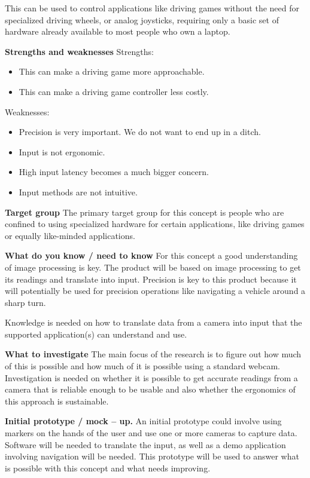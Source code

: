 This can be used to control applications like driving games without the need for specialized driving wheels, or analog joysticks, requiring only a basic set of hardware already available to most people who own a laptop. 
\bigskip

\noindent\textbf{Strengths and weaknesses} \newline
Strengths:
\begin{itemize}
\item This can make a driving game more approachable.
\item This can make a driving game controller less costly.
\end{itemize}
Weaknesses:
\begin{itemize}
\item Precision is very important. We do not want to end up in a ditch.
\item Input is not ergonomic.
\item High input latency becomes a much bigger concern.
\item Input methods are not intuitive.
\end{itemize}
\bigskip

\noindent\textbf{Target group} \newline
The primary target group for this concept is people who are confined to using specialized hardware for certain applications, like driving games or equally like-minded applications.
\bigskip

\noindent\textbf{What do you know / need to know} \newline
For this concept a good understanding of image processing is key. The product will be based on image processing to get its readings and translate into input. Precision is key to this product because it will potentially be used for precision operations like navigating a vehicle around a sharp turn.

Knowledge is needed on how to translate data from a camera into input that the supported application(s) can understand and use.
\bigskip

\noindent\textbf{What to investigate} \newline
The main focus of the research is to figure out how much of this is possible and how much of it is possible using a standard webcam. Investigation is needed on whether it is possible to get accurate readings from a camera that is reliable enough to be usable and also whether the ergonomics of this approach is sustainable.
\bigskip

\noindent\textbf{Initial prototype / mock – up.} \newline
An initial prototype could involve using markers on the hands of the user and use one or more cameras to capture data. Software will be needed to translate the input, as well as a demo application involving navigation will be needed. This prototype will be used to answer what is possible with this concept and what needs improving. 

